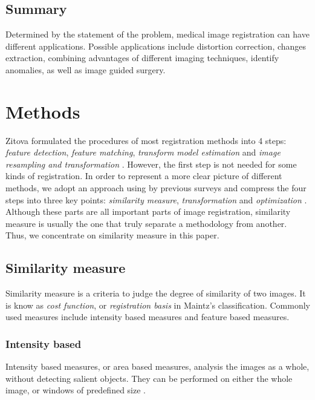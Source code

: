 \documentclass{IEEEtran}
\begin{document}
  \subsection{Summary}

  Determined by the statement of the problem, medical image registration can have different applications. Possible applications include distortion correction, changes extraction, combining advantages of different imaging techniques, identify anomalies, as well as image guided surgery.

  \section{Methods}

  Zitova formulated the procedures of most registration methods into 4 steps: \emph{feature detection}, \emph{feature matching}, \emph{transform model estimation} and \emph{image resampling and transformation} \cite{zitova2003image}. However, the first step is not needed for some kinds of registration. In order to represent a more clear picture of different methods, we adopt an approach using by previous surveys and compress the four steps into three key points: \emph{similarity measure}, \emph{transformation} and \emph{optimization} \cite{sotiras2013deformable, oliveira2014medical}. Although these parts are all important parts of image registration, similarity measure is usually the one that truly separate a methodology from another. Thus, we concentrate on similarity measure in this paper.

  \subsection{Similarity measure}

  Similarity measure is a criteria to judge the degree of similarity of two images. It is know as \emph{cost function}, or \emph{registration basis} in Maintz's classification. Commonly used measures include intensity based measures and feature based measures.

  \subsubsection{Intensity based}

  Intensity based measures, or area based measures, analysis the images as a whole, without detecting salient objects. They can be performed on either the whole image, or windows of predefined size \cite{zitova2003image}.
\end{document}
